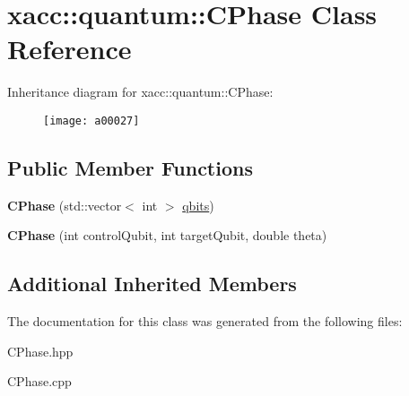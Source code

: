 \hypertarget{a00027}{}\section{xacc\+:\+:quantum\+:\+:C\+Phase Class Reference}
\label{a00027}
Inheritance diagram for xacc\+:\+:quantum\+:\+:C\+Phase\+:\begin{figure}[H]
\begin{center}
\leavevmode
\texttt{[image: a00027]}
\end{center}
\end{figure}
\subsection*{Public Member Functions}
\begin{DoxyCompactItemize}
\item 
{\bfseries C\+Phase} (std\+::vector$<$ int $>$ \hyperlink{a00042_a2a56be6c2519ea65df4d06f4abae1393}{qbits})\hypertarget{a00027_a5899f838bc4b892d179f51fcf0ac4cc8}{}\label{a00027_a5899f838bc4b892d179f51fcf0ac4cc8}

\item 
{\bfseries C\+Phase} (int control\+Qubit, int target\+Qubit, double theta)\hypertarget{a00027_af642f499455f0065279a1e1d178c818f}{}\label{a00027_af642f499455f0065279a1e1d178c818f}

\end{DoxyCompactItemize}
\subsection*{Additional Inherited Members}


The documentation for this class was generated from the following files\+:\begin{DoxyCompactItemize}
\item 
C\+Phase.\+hpp\item 
C\+Phase.\+cpp\end{DoxyCompactItemize}
